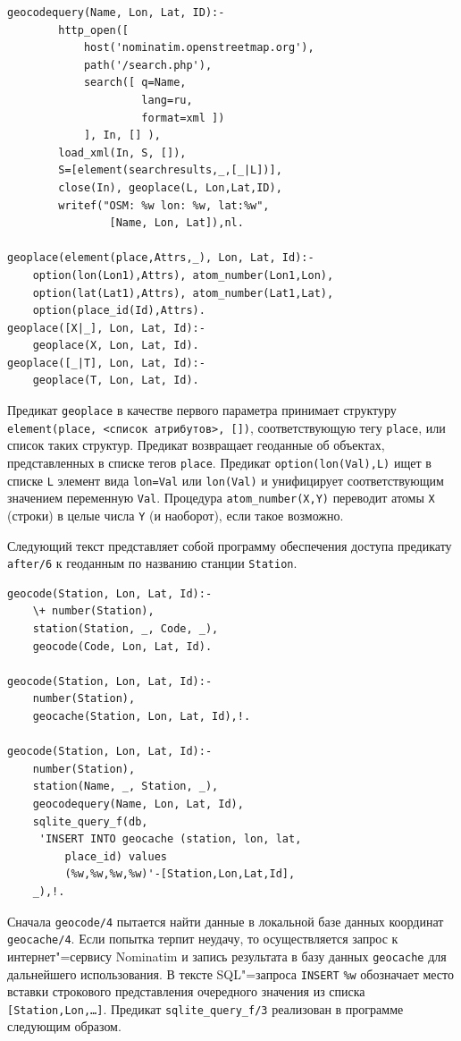 \documentclass[a4paper,14pt, openany, twoside, draft]{extbook} %
\begin{document}
\begin{verbatim}
geocodequery(Name, Lon, Lat, ID):-
        http_open([
            host('nominatim.openstreetmap.org'),
            path('/search.php'),
            search([ q=Name,
                     lang=ru,
                     format=xml ])
            ], In, [] ),
        load_xml(In, S, []),
        S=[element(searchresults,_,[_|L])],
        close(In), geoplace(L, Lon,Lat,ID),
        writef("OSM: %w lon: %w, lat:%w",
                [Name, Lon, Lat]),nl.

geoplace(element(place,Attrs,_), Lon, Lat, Id):-
    option(lon(Lon1),Attrs), atom_number(Lon1,Lon),
    option(lat(Lat1),Attrs), atom_number(Lat1,Lat),
    option(place_id(Id),Attrs).
geoplace([X|_], Lon, Lat, Id):-
    geoplace(X, Lon, Lat, Id).
geoplace([_|T], Lon, Lat, Id):-
    geoplace(T, Lon, Lat, Id).
\end{verbatim}


Предикат \texttt{geoplace} в качестве первого параметра принимает структуру \texttt{element(place, <список атрибутов>, [])}, соответствующую тегу \texttt{place}, или список таких структур.  Предикат возвращает геоданные об объектах, представленных в списке тегов \texttt{place}.  Предикат \texttt{option(lon(Val),L)} ищет в списке \texttt{L} элемент вида \texttt{lon=Val} или \texttt{lon(Val)} и унифицирует соответствующим значением переменную \texttt{Val}.  Процедура \texttt{atom\_number(X,Y)} переводит атомы \texttt{X} (строки) в целые числа \texttt{Y} (и наоборот), если такое возможно.

Следующий текст представляет собой программу обеспечения доступа предикату \texttt{after/6} к геоданным по названию станции \texttt{Station}.

\begin{verbatim}
geocode(Station, Lon, Lat, Id):-
    \+ number(Station),
    station(Station, _, Code, _),
    geocode(Code, Lon, Lat, Id).

geocode(Station, Lon, Lat, Id):-
    number(Station),
    geocache(Station, Lon, Lat, Id),!.

geocode(Station, Lon, Lat, Id):-
    number(Station),
    station(Name, _, Station, _),
    geocodequery(Name, Lon, Lat, Id),
    sqlite_query_f(db,
     'INSERT INTO geocache (station, lon, lat,
         place_id) values
         (%w,%w,%w,%w)'-[Station,Lon,Lat,Id],
    _),!.
\end{verbatim}


Сначала \texttt{geocode/4} пытается найти данные в локальной базе данных координат \texttt{geocache/4}.  Если попытка терпит неудачу, то осуществляется запрос к интернет"=сервису \foreignlanguage{latin}{Nominatim} и запись результата в базу данных \texttt{geocache} для дальнейшего использования.  В тексте SQL"=запроса \texttt{INSERT} \texttt{\%w} обозначает место вставки строкового представления очередного значения из списка \texttt{[Station,Lon,\ldots]}.  Предикат \texttt{sqlite\_query\_f/3} реализован в программе следующим образом.
\end{document}
